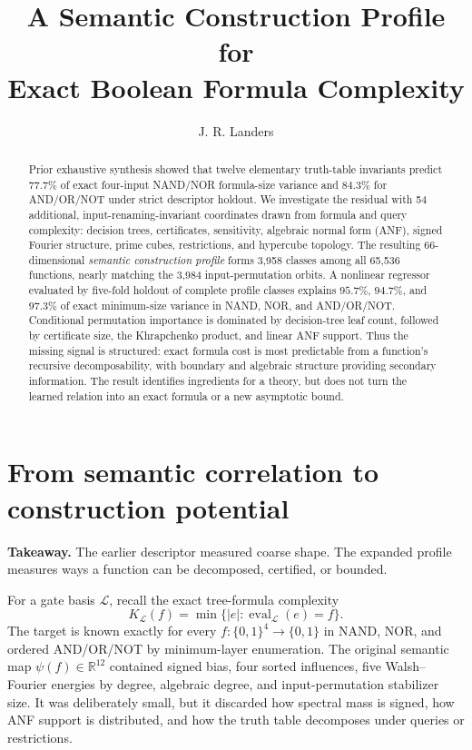 \documentclass[10pt]{article}
\title{\vspace{-1.7em}\textbf{A Semantic Construction Profile for}\\[-1pt]
\textbf{Exact Boolean Formula Complexity}}
\author{J. R. Landers}
\date{\vspace{-1.4em}}
\theoremstyle{definition}
\begin{document}
\maketitle
\vspace{-1.6em}

\begin{abstract}
Prior exhaustive synthesis showed that twelve elementary truth-table invariants
predict $77.7\%$ of exact four-input NAND/NOR formula-size variance and $84.3\%$
for AND/OR/NOT under strict descriptor holdout.  We investigate the residual
with 54 additional, input-renaming-invariant coordinates drawn from formula
and query complexity: decision trees, certificates, sensitivity, algebraic
normal form (ANF), signed Fourier structure, prime cubes, restrictions, and
hypercube topology.  The resulting 66-dimensional \emph{semantic construction
profile} forms 3,958 classes among all 65,536 functions, nearly matching the
3,984 input-permutation orbits.  A nonlinear regressor evaluated by five-fold
holdout of complete profile classes explains $95.7\%$, $94.7\%$, and $97.3\%$
of exact minimum-size variance in NAND, NOR, and AND/OR/NOT.  Conditional
permutation importance is dominated by decision-tree leaf count, followed by
certificate size, the Khrapchenko product, and linear ANF support.  Thus the
missing signal is structured: exact formula cost is most predictable from a
function's recursive decomposability, with boundary and algebraic structure
providing secondary information.  The result identifies ingredients for a
theory, but does not turn the learned relation into an exact formula or a new
asymptotic bound.
\end{abstract}

\section{From semantic correlation to construction potential}

\textbf{Takeaway.} The earlier descriptor measured coarse shape.  The expanded
profile measures ways a function can be decomposed, certified, or bounded.

For a gate basis $\mathcal L$, recall the exact tree-formula complexity
\[
 K_{\mathcal L}(f)=\min\{|e|:\operatorname{eval}_{\mathcal L}(e)=f\}.
 \tag{1}
\]
The target is known exactly for every $f:\{0,1\}^4\to\{0,1\}$ in NAND, NOR,
and ordered AND/OR/NOT by minimum-layer enumeration.  The original semantic
map $\psi(f)\in\mathbb R^{12}$ contained signed bias, four sorted influences,
five Walsh--Fourier energies by degree, algebraic degree, and input-permutation
stabilizer size.  It was deliberately small, but it discarded how spectral
mass is signed, how ANF support is distributed, and how the truth table
decomposes under queries or restrictions.
\end{document}
